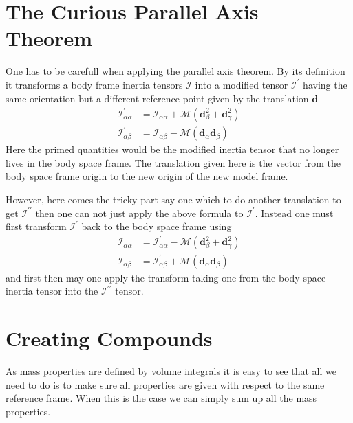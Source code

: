 \documentclass[twocolumn]{article}
\renewcommand{\vec}[1]{ \ensuremath{\mathbf{#1} } }
\newcommand{\inertia}{\ensuremath{\mathcal{I} }}
\newcommand{\mass}{\ensuremath{\mathcal{M} }}
\begin{document}
\section*{The Curious Parallel Axis Theorem}\label{sec:curi-parall-axis}
One has to be carefull when applying the parallel axis theorem. By its
definition it transforms a body frame inertia tensors $\inertia$ into a modified
tensor $\inertia^\prime$
having the same orientation but a different reference point given by the
translation $\vec d$
\begin{subequations}
  \begin{align}
    \inertia_{\alpha \alpha}^\prime 
    &=
    \inertia_{\alpha \alpha} + \mass (\vec d_{\beta}^2  + \vec d_{\gamma}^2)\\
    \inertia_{\alpha \beta}^\prime &=  \inertia_{\alpha \beta} - \mass (\vec
    d_{\alpha} \vec d_{\beta})
  \end{align}
\end{subequations}
Here the primed quantities would be the modified inertia tensor that no longer
lives in the body space frame. The translation given here is the vector from the
body space frame origin to the new origin of the new model frame.

However, here comes the tricky part say one which to do another translation to
get $\inertia^{\prime\prime}$ then one can not just apply the above formula to
$\inertia^\prime$. Instead one must first transform $\inertia^\prime$ back to the
body space frame using 
\begin{subequations}
  \begin{align}
    \inertia_{\alpha \alpha} 
    &=
    \inertia_{\alpha \alpha}^\prime - \mass (\vec d_{\beta}^2  + \vec d_{\gamma}^2)
    \\
    \inertia_{\alpha \beta} 
    &=
    \inertia_{\alpha \beta}^\prime + \mass (\vec d_{\alpha} \vec d_{\beta})
  \end{align}
\end{subequations}
and first then may one apply the transform taking one from the body space
inertia tensor into the $\inertia^{\prime\prime}$ tensor.

\section*{Creating Compounds}\label{sec:creating-compounds}
As mass properties are defined by volume integrals it is easy to see that all we
need to do is to make sure all properties are given with respect to the same
reference frame. When this is the case we can simply sum up all the mass
properties.
\end{document}

